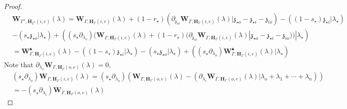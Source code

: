 \documentclass[11pt]{amsart}
\theoremstyle{definition}
\theoremstyle{remark}
\numberwithin{equation}{section}
\begin{document}
\begin{proof}
  \begin{align*}
& \mathbf{W}_{\Gamma^{\star},\mathbf{H}_{\Gamma^{\star}}(i,e)}(\lambda)  =\mathbf{W}_{\Gamma,\mathbf{H}_{\Gamma}(i,e)}(\lambda)+(1-r_{\star})\left(\partial_{\mathfrak{z}_{io}}\mathbf{W}_{\Gamma,\mathbf{H}_{\Gamma}(i,e)}(\lambda)|\mathfrak{z}_{\star o}-\mathfrak{z}_{\star i}-\mathfrak{z}_{io}\right)-\left((1-s_{\star})\mathfrak{z}_{\star i}|\lambda_{\star}\right)\\
&-\left(s_{\star}\mathfrak{z}_{\star o}|\lambda_{\star}\right)+\left((s_{\star}\partial_{\lambda_o})(\mathbf{W}_{\Gamma,\mathbf{H}_{\Gamma}(i,e)}(\lambda)+(1-r_{\star})(\partial_{\mathfrak{z}_{io}}\mathbf{W}_{\Gamma,\mathbf{H}_{\Gamma}(i,e)}(\lambda)|\mathfrak{z}_{\star o}-\mathfrak{z}_{\star i}-\mathfrak{z}_{io}))|\lambda_{\star}\right)\\
&=\mathbf{W}^{\blacktriangle}_{\Gamma,\mathbf{H}_{\Gamma}(i,e)}(\lambda)-\left((1-s_{\star})\mathfrak{z}_{\star i}|\lambda_{\star}\right)-\left(s_{\star}\mathfrak{z}_{\star o}|\lambda_{\star}\right)+\left((s_{\star}\partial_{\lambda_o})\mathbf{W}^{\blacktriangle}_{\Gamma,\mathbf{H}_{\Gamma}(i,e)}(\lambda)|\lambda_{\star}\right)
\end{align*}
Note that $\partial_{\lambda_o}\mathbf{W}_{\Gamma,\mathbf{H}_{\Gamma}(o,e)}(\lambda)=0$,
\begin{align*}
   & (s_{\star}\partial_{\lambda_o})\mathbf{W}_{\Gamma,\mathbf{H}_{\Gamma}(i,e)}(\lambda)=   (s_{\star}\partial_{\lambda_o})\left(\mathbf{W}_{\Gamma,\mathbf{H}_{\Gamma}(o,e)}(\lambda)-(\partial_{\lambda_i}\mathbf{W}_{\Gamma,\mathbf{H}_{\Gamma}(o,e)}(\lambda)|\lambda_o+\lambda_1+\cdots+\lambda_n)\right) \\
   & =  -(s_{\star}\partial_{\lambda_i})\mathbf{W}_{\Gamma,\mathbf{H}_{\Gamma}(o,e)}(\lambda)
\end{align*}


\end{proof}
\end{document}
